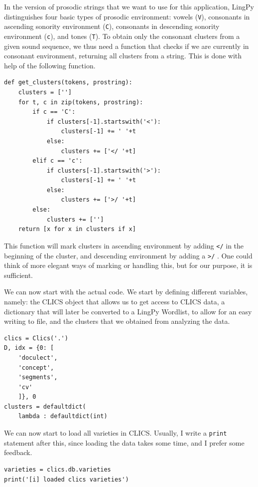 \documentclass[
  a4paper,
  14pt,
  oneside,
  tablecaptionabove
]{scrbook}
\begin{document}
In the version of prosodic strings that we want to use for this
application, LingPy distinguishes four basic types of prosodic
environment: vowels (\lstinline!V!), consonants in ascending sonority
environment (\lstinline!C!), consonants in descending sonority
environment (\lstinline!c!), and tones (\lstinline!T!). To obtain
only the consonant clusters from a given sound sequence, we thus need a
function that checks if we are currently in consonant environment,
returning all clusters from a string. This is done with help of the
following function.

\begin{lstlisting}[basicstyle=\small]
def get_clusters(tokens, prostring):
    clusters = ['']
    for t, c in zip(tokens, prostring):
        if c == 'C':
            if clusters[-1].startswith('<'):
                clusters[-1] += ' '+t
            else:
                clusters += ['</ '+t]
        elif c == 'c':
            if clusters[-1].startswith('>'):
                clusters[-1] += ' '+t
            else:
                clusters += ['>/ '+t]
        else:
            clusters += ['']
    return [x for x in clusters if x]
\end{lstlisting}

This function will mark clusters in ascending environment by adding
\lstinline!</! in the beginning of the cluster, and descending
environment by adding a \lstinline!>/! . One could think of more elegant
ways of marking or handling this, but for our purpose, it is sufficient.

We can now start with the actual code. We start by defining different
variables, namely: the CLICS object that allows us to get access to
CLICS data, a dictionary that will later be converted to a LingPy
Wordlist, to allow for an easy writing to file, and the clusters that we
obtained from analyzing the data.

\begin{lstlisting}[basicstyle=\small]
clics = Clics('.') 
D, idx = {0: [ 
    'doculect', 
    'concept', 
    'segments', 
    'cv' 
    ]}, 0 
clusters = defaultdict( 
    lambda : defaultdict(int)
\end{lstlisting}

We can now start to load all varieties in CLICS. Usually, I write a
\lstinline!print! statement after this, since loading the data takes
some time, and I prefer some feedback.

\begin{lstlisting}[basicstyle=\small]
varieties = clics.db.varieties
print('[i] loaded clics varieties')
\end{lstlisting}
\end{document}
